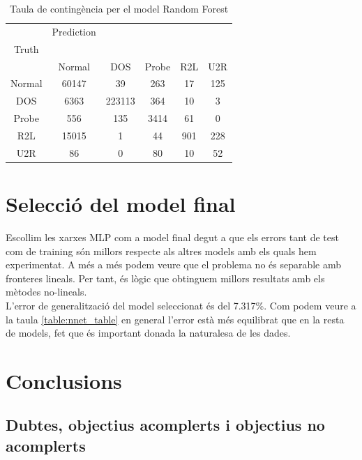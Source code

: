 \documentclass[a4paper]{article} %
\begin{document}
\begin{table}[H]
	\centering
	\begin{tabular}{c | c c c c c}
			& Prediction\\
		Truth\\
				& Normal & DOS & Probe & R2L & U2R \\
		\hline
		Normal	& 60147	& 39 	 & 263	 & 17 	& 125 \\
		DOS		& 6363	& 223113 & 364	 & 10  	& 3\\
		Probe	& 556	& 135	 & 3414	 & 61	&  0 \\
		R2L		& 15015	& 1		 & 44   & 901 & 228\\
		U2R		& 86	& 0		 & 80    &  10 	& 52\\	
	\end{tabular}
	\caption{Taula de contingència per el model Random Forest}
	\label{table:random}
\end{table}


\section{Selecció del model final}
Escollim les xarxes MLP com a model final degut a que els errors tant de test com de training són millors respecte als altres models amb els quals hem experimentat. A més a més podem veure que el problema no és separable amb fronteres lineals. Per tant, és lògic que obtinguem millors resultats amb els mètodes no-lineals. \\
L'error de generalització del model seleccionat és del 7.317\%. Com podem veure a la taula \ref{table:nnet_table} en general l'error està més equilibrat que en la resta de models, fet que és important donada la naturalesa de les dades.
\section{Conclusions}
\subsection{Dubtes, objectius acomplerts i objectius no acomplerts}
\end{document}
